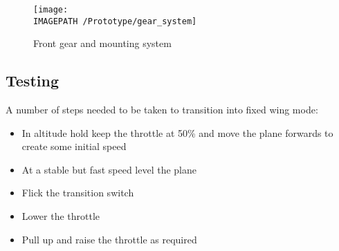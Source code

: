 \begin{figure}[!h]
	\centering
	\texttt{[image: \\IMAGEPATH /Prototype/gear\_system]}
	\caption{Front gear and mounting system}
	\label{fig:gearsys}
\end{figure}

\subsection{Testing}
A number of steps needed to be taken to transition into fixed wing mode: 
\begin{itemize}
\item In altitude hold keep the throttle at 50\% and move the plane forwards to create some initial speed
\item At a stable but fast speed level the plane
\item Flick the transition switch 
\item Lower the throttle
\item Pull up and raise the throttle as required
		
\end{itemize}
